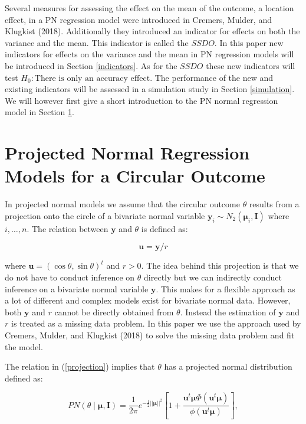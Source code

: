 \documentclass[11pt,]{article}
\begin{document}
Several measures for assessing the effect on the mean of the outcome, a
location effect, in a PN regression model were introduced in Cremers,
Mulder, and Klugkist (2018). Additionally they introduced an indicator
for effects on both the variance and the mean. This indicator is called
the \(SSDO\). In this paper new indicators for effects on the variance
and the mean in PN regression models will be introduced in Section
\ref{indicators}. As for the \(SSDO\) these new indicators will test
\textit{$H_0: \text{There is only an accuracy effect}$}. The performance
of the new and existing indicators will be assessed in a simulation
study in Section \ref{simulation}. We will however first give a short
introduction to the PN normal regression model in Section
\ref{regmodel}.

\section{Projected Normal Regression Models for a Circular Outcome}\label{regmodel}

In projected normal models we assume that the circular outcome
\(\theta\) results from a projection onto the circle of a bivariate
normal variable
\(\boldsymbol{y}_i \sim N_2(\boldsymbol{\mu}_i, \boldsymbol{I})\) where
\(i, \dots, n\). The relation between \(\boldsymbol{y}\) and \(\theta\)
is defined as:

\begin{equation}\label{projection}
\boldsymbol{u} = \boldsymbol{y}/r
\end{equation}

where \(\boldsymbol{u} = (\cos\theta, \sin\theta)^t\) and \(r > 0\). The
idea behind this projection is that we do not have to conduct inference
on \(\theta\) directly but we can indirectly conduct inference on a
bivariate normal variable \(\boldsymbol{y}\). This makes for a flexible
approach as a lot of different and complex models exist for bivariate
normal data. However, both \(\boldsymbol{y}\) and \(r\) cannot be
directly obtained from \(\theta\). Instead the estimation of
\(\boldsymbol{y}\) and \(r\) is treated as a missing data problem. In
this paper we use the approach used by Cremers, Mulder, and Klugkist
(2018) to solve the missing data problem and fit the model.

The relation in (\ref{projection}) implies that \(\theta\) has a
projected normal distribution defined as:

\begin{equation}
PN(\theta \mid \boldsymbol{\mu}, \boldsymbol{I})  = \frac{1}{2 \pi} e^{-\frac{1}{2}\vert \vert \boldsymbol\mu \vert \vert ^ 2} \left[1+\frac{\boldsymbol{u}^t\boldsymbol\mu\Phi(\boldsymbol{u}^t\boldsymbol\mu)}{\phi(\boldsymbol{u}^t\boldsymbol\mu)}\right],
\end{equation}
\end{document}
